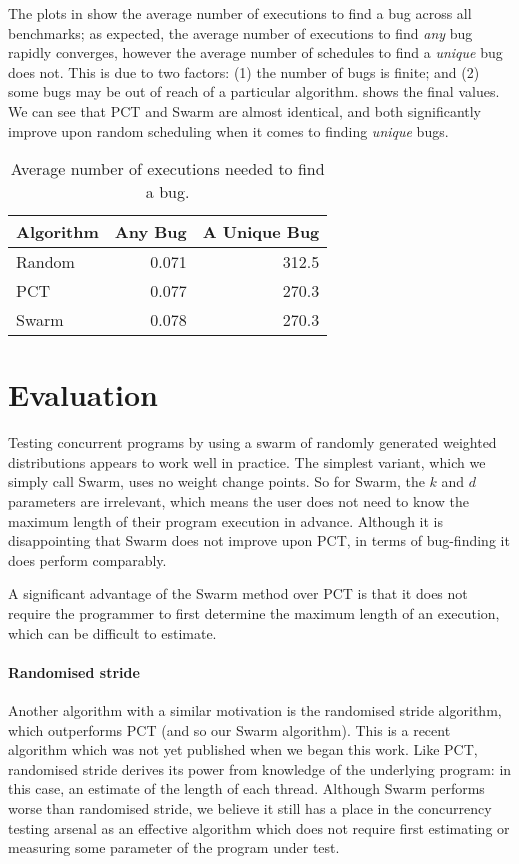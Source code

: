 The plots in  show the average number of executions
to find a bug across all benchmarks; as expected, the average number
of executions to find \emph{any} bug rapidly converges, however the
average number of schedules to find a \emph{unique} bug does not.
This is due to two factors: (1) the number of bugs is finite; and (2)
some bugs may be out of reach of a particular algorithm.
 shows the final values.  We can see that PCT and
Swarm are almost identical, and both significantly improve upon random
scheduling when it comes to finding \emph{unique} bugs.

\begin{table}
  \centering
  \begin{tabular}{lrr} \toprule
    Algorithm & Any Bug & A Unique Bug \\ \midrule
    Random & 0.071 & 312.5 \\
    PCT   & 0.077 & 270.3 \\
    Swarm & 0.078 & 270.3 \\ \bottomrule
  \end{tabular}
  \caption{Average number of executions needed to find a bug.}\label{tbl:freqs}
\end{table}

\section{Evaluation}
\label{sec:algorithms-eval}

Testing concurrent programs by using a swarm of randomly generated
weighted distributions appears to work well in practice.  The simplest
variant, which we simply call Swarm, uses no weight change points.  So
for Swarm, the $k$ and $d$ parameters are irrelevant, which means the
user does not need to know the maximum length of their program
execution in advance.  Although it is disappointing that Swarm does
not improve upon PCT, in terms of bug-finding it does perform
comparably.

A significant advantage of the Swarm method over PCT is that it does
not require the programmer to first determine the maximum length of an
execution, which can be difficult to estimate.

\paragraph{Randomised stride}
Another algorithm with a similar motivation is the randomised stride
algorithm\cite{abdelrasoul2017}, which outperforms PCT (and so our
Swarm algorithm).  This is a recent algorithm which was not yet
published when we began this work.  Like PCT, randomised stride
derives its power from knowledge of the underlying program: in this
case, an estimate of the length of each thread.  Although Swarm
performs worse than randomised stride, we believe it still has a place
in the concurrency testing arsenal as an effective algorithm which
does not require first estimating or measuring some parameter of the
program under test.

